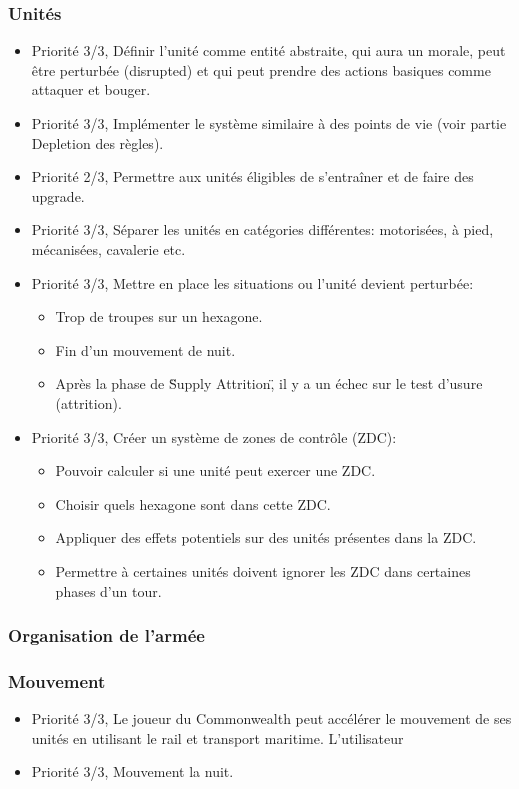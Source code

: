 \documentclass{article}[a4paper, 12pt]
\begin{document}
\subsubsection{Unités}
\begin{itemize}
    \item Priorité 3/3, Définir l'unité comme entité abstraite, qui aura un morale, peut être perturbée (disrupted) et qui peut prendre des actions basiques comme attaquer et bouger.
    \item Priorité 3/3, Implémenter le système similaire à des points de vie (voir partie Depletion des règles).
    \item Priorité 2/3, Permettre aux unités éligibles de s'entraîner et de faire des upgrade.
    \item Priorité 3/3, Séparer les unités en catégories différentes: motorisées, à pied, mécanisées, cavalerie etc.
    \item Priorité 3/3, Mettre en place les situations ou l'unité devient perturbée:
    \begin{itemize}
        \item Trop de troupes sur un hexagone.
        \item Fin d'un mouvement de nuit.
        \item Après la phase de \"Supply Attrition\", il y a un échec sur le test d'usure (attrition).
    \end{itemize}
    \item Priorité 3/3, Créer un système de zones de contrôle (ZDC):
    \begin{itemize}
        \item Pouvoir calculer si une unité peut exercer une ZDC.
        \item Choisir quels hexagone sont dans cette ZDC.
        \item Appliquer des effets potentiels sur des unités présentes dans la ZDC.
        \item Permettre à certaines unités doivent ignorer les ZDC dans certaines phases d'un tour.
    \end{itemize}
    
\end{itemize}


\subsubsection{Organisation de l'armée}



\subsubsection{Mouvement}
\begin{itemize}
    \item Priorité 3/3, Le joueur du Commonwealth peut accélérer le mouvement de ses unités en utilisant le rail et transport maritime.
    L'utilisateur 
    \item Priorité 3/3, Mouvement la nuit.
\end{itemize}
\end{document}
